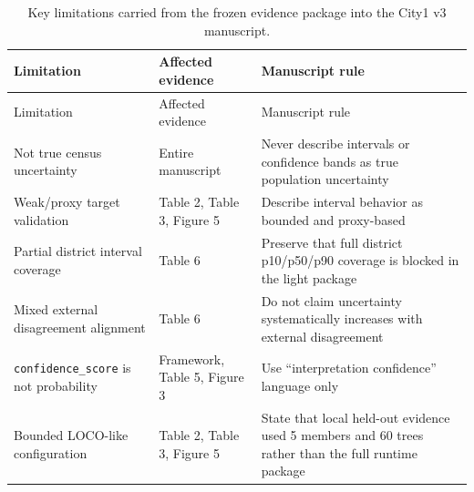 \begin{longtable}{L{3.2cm}L{4.0cm}L{5.6cm}}
\caption{Key limitations carried from the frozen evidence package into the City1 v3 manuscript.}\label{tab:s3-limitations}\\
\toprule
Limitation & Affected evidence & Manuscript rule \\
\midrule
\endfirsthead
\toprule
Limitation & Affected evidence & Manuscript rule \\
\midrule
\endhead
Not true census uncertainty & Entire manuscript & Never describe intervals or confidence bands as true population uncertainty \\
Weak/proxy target validation & Table 2, Table 3, Figure 5 & Describe interval behavior as bounded and proxy-based \\
Partial district interval coverage & Table 6 & Preserve that full district p10/p50/p90 coverage is blocked in the light package \\
Mixed external disagreement alignment & Table 6 & Do not claim uncertainty systematically increases with external disagreement \\
\texttt{confidence\_score} is not probability & Framework, Table 5, Figure 3 & Use ``interpretation confidence'' language only \\
Bounded LOCO-like configuration & Table 2, Table 3, Figure 5 & State that local held-out evidence used 5 members and 60 trees rather than the full runtime package \\
\bottomrule
\end{longtable}

